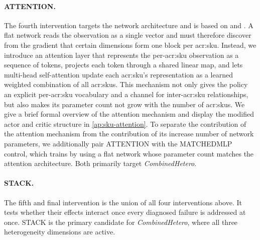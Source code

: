 \paragraph{\textbf{ATTENTION.}} The fourth intervention targets the network architecture and is based on \citet{hu2021updet} and \citep{zambaldi2018relational}. A flat network reads the observation as a single vector and must therefore discover from the gradient that certain dimensions form one
block per \gls{acr:sku}. Instead, we introduce an attention layer that represents the per-\gls{acr:sku} observation as a sequence of tokens, projects each token through a shared linear map, and lets multi-head self-attention update each \gls{acr:sku}'s representation as a learned weighted combination of all \glspl{acr:sku}. This mechanism not only gives the
policy an explicit per-\gls{acr:sku} vocabulary and a channel for inter-\gls{acr:sku} relationships, but also makes its parameter count not grow with the number of \glspl{acr:sku}. We give a brief formal overview of the attention mechanism and display the modified actor and critic structure in \autoref{ap:sku-attention}. To separate the contribution of the attention
mechanism from the contribution of its increase number of network parameters, we additionally pair ATTENTION with the MATCHEDMLP control, which trains by using a flat network whose parameter count matches the
attention architecture. Both primarily target \textit{CombinedHetero}.

\paragraph{\textbf{STACK.}} The fifth and final intervention is the union of all four interventions above. It tests whether their effects interact once every diagnosed failure is addressed at once. STACK is the primary candidate for \textit{CombinedHetero}, where all three heterogeneity dimensions are active.\\

